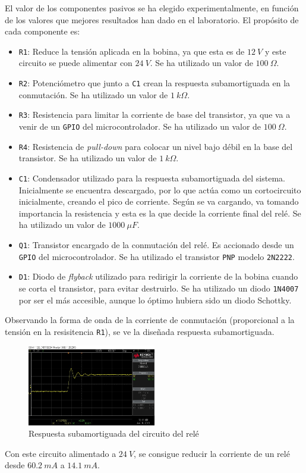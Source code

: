 El valor de los componentes pasivos se ha elegido experimentalmente, en función de los valores que mejores resultados han dado en el laboratorio. El propósito de cada componente es:
\begin{itemize}
    \item \texttt{R1}: Reduce la tensión aplicada en la bobina, ya que esta es de $12\ V$ y este circuito se puede alimentar con $24\ V$. Se ha utilizado un valor de $100\ \Omega$.
    \item \texttt{R2}: Potenciómetro que junto a \texttt{C1} crean la respuesta subamortiguada en la conmutación. Se ha utilizado un valor de $1\ k\Omega$.
    \item \texttt{R3}: Resistencia para limitar la corriente de base del transistor, ya que va a venir de un \texttt{GPIO} del microcontrolador. Se ha utilizado un valor de $100\ \Omega$.
    \item \texttt{R4}: Resistencia de \textit{pull-down} para colocar un nivel bajo débil en la base del transistor. Se ha utilizado un valor de $1\ k\Omega$.
    \item \texttt{C1}: Condensador utilizado para la respuesta subamortiguada del sistema. Inicialmente se encuentra descargado, por lo que actúa como un cortocircuito inicialmente, creando el pico de corriente. Según se va cargando, va tomando importancia la resistencia y esta es la que decide la corriente final del relé. Se ha utilizado un valor de $1000\ \mu F$.
    \item \texttt{Q1}: Transistor encargado de la conmutación del relé. Es accionado desde un \texttt{GPIO} del microcontrolador. Se ha utilizado el transistor \texttt{PNP} modelo \texttt{2N2222}. 
    \item \texttt{D1}: Diodo de \textit{flyback} utilizado para redirigir la corriente de la bobina cuando se corta el transistor, para evitar destruirlo. Se ha utilizado un diodo \texttt{1N4007} por ser el más accesible, aunque lo óptimo hubiera sido un diodo Schottky.
\end{itemize}

Observando la forma de onda de la corriente de conmutación (proporcional a la tensión en la resisitencia \texttt{R1}), se ve la diseñada respuesta subamortiguada.

\begin{figure}[H]
    \centering
    \includegraphics[width=0.5\textwidth]{images/2-hardware/componentes/rele/respuestaSubamortiguada.jpg}
    \caption{Respuesta subamortiguada del circuito del relé}
    \label{fig:hardware/reles/respuesta}
\end{figure}

Con este circuito alimentado a $24\ V$, se consigue reducir la corriente de un relé desde $60.2\ mA$ a $14.1\ mA$.